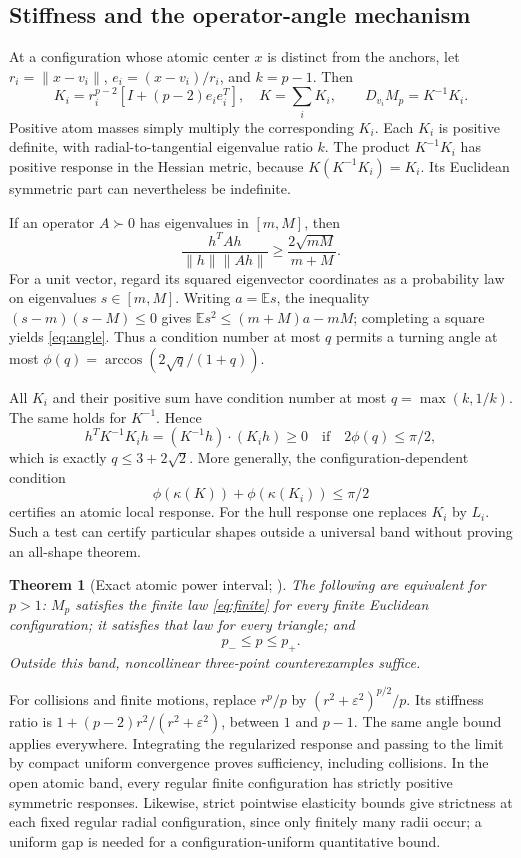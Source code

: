 \documentclass[11pt]{article}
\newtheorem{theorem}{Theorem}[section]
\theoremstyle{definition}
\newcommand{\E}{\mathbb E}
\newcommand{\pn}{p_{-}}
\newcommand{\pp}{p_{+}}
\begin{document}
\subsection{Stiffness and the operator-angle mechanism}
At a configuration whose atomic center $x$ is distinct from the anchors,
let $r_i=\|x-v_i\|$, $e_i=(x-v_i)/r_i$, and $k=p-1$. Then
\begin{equation}\label{eq:atomicresponse}
 K_i=r_i^{p-2}[I+(p-2)e_ie_i^T],\quad K=\sum_iK_i,
 \qquad D_{v_i}M_p=K^{-1}K_i.
\end{equation}
Positive atom masses simply multiply the corresponding $K_i$.
Each $K_i$ is positive definite, with radial-to-tangential eigenvalue ratio
$k$. The product $K^{-1}K_i$ has positive response in the Hessian metric,
because $K(K^{-1}K_i)=K_i$. Its Euclidean symmetric part can nevertheless
be indefinite.

If an operator $A\succ0$ has eigenvalues in $[m,M]$, then
\begin{equation}\label{eq:angle}
 \frac{h^TAh}{\|h\|\|Ah\|}\ge\frac{2\sqrt{mM}}{m+M}.
\end{equation}
For a unit vector, regard its squared eigenvector coordinates as a
probability law on eigenvalues $s\in[m,M]$. Writing $a=\E s$, the inequality
$(s-m)(s-M)\le0$ gives $\E s^2\le(m+M)a-mM$; completing a square yields
\eqref{eq:angle}. Thus a condition number at most $q$ permits a turning angle
at most $\phi(q)=\arccos(2\sqrt q/(1+q))$.

All $K_i$ and their positive sum have condition number at most
$q=\max(k,1/k)$. The same holds for $K^{-1}$. Hence
\[
 h^TK^{-1}K_i h=(K^{-1}h)\cdot(K_i h)\ge0
 \quad\text{if}\quad 2\phi(q)\le\pi/2,
\]
which is exactly $q\le3+2\sqrt2$.
More generally, the configuration-dependent condition
\[
 \phi(\kappa(K))+\phi(\kappa(K_i))\le\pi/2
\]
certifies an atomic local response. For the hull response one replaces
$K_i$ by $L_i$. Such a test can certify particular shapes outside a universal
band without proving an all-shape theorem.

\begin{theorem}[Exact atomic power interval; \cite{PaperIII,Handoff}]
\label{thm:atomic}
The following are equivalent for $p>1$: $M_p$ satisfies the finite law
\eqref{eq:finite} for every finite Euclidean configuration; it satisfies
that law for every triangle; and
\begin{equation}\label{eq:atomicband}
 \boxed{\pn\le p\le\pp.}
\end{equation}
Outside this band, noncollinear three-point counterexamples suffice.
\end{theorem}
For collisions and finite motions, replace $r^p/p$ by
$(r^2+\varepsilon^2)^{p/2}/p$. Its stiffness ratio is
$1+(p-2)r^2/(r^2+\varepsilon^2)$, between $1$ and $p-1$. The same angle
bound applies everywhere. Integrating the regularized response and passing
to the limit by compact uniform convergence proves sufficiency, including
collisions.
In the open atomic band, every regular finite configuration has strictly
positive symmetric responses. Likewise, strict pointwise elasticity bounds
give strictness at each fixed regular radial configuration, since only
finitely many radii occur; a uniform gap is needed for a configuration-uniform
quantitative bound.
\end{document}
